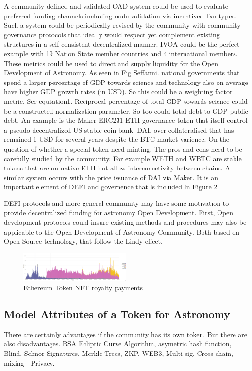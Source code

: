 \documentclass[final,5p,times,twocolumn,authoryear]{elsarticle}
\begin{document}
A community defined and validated OAD system could be used to evaluate preferred funding channels including node validation via incentives Txn types. Such a system could be periodically revised by the community with community governance protocols that ideally would respect yet complement existing structures in a self-consistent decentralized manner. IVOA could be the perfect example with 19 Nation State member countries and 4 international members. These metrics could be used to direct and supply liquidity for the Open Development of Astronomy. As seen in Fig Seffanni. national governments that spend a larger percentage of GDP towards science and technology also on average have higher GDP growth rates (in USD). So this could be a weighting factor metric. See equtation1. Reciprocal percentage of total GDP towards science could be a constructed normalization parameter. So too could total debt to GDP public debt.  An example is the Maker ERC231 ETH governance token that itself control a  pseudo-decentralized US stable coin bank, DAI, over-collateralised that has remained 1 USD for several years despite the BTC market varience.  On the question of whether a special token need minting. The pros and cons need to be carefully studied by the community. For example WETH and WBTC are stable tokens that are on native ETH but allow interconectivity between chains. A similar system occurs with the price issuance of DAI via Maker. It is an important element of DEFI and governence that is included in Figure 2.   

DEFI protocols and more general community may have some motivation to provide decentralized funding for astronomy Open Development. First, Open development protocols could insure existing methods and procedures may also be applicable to the Open Development of Astronomy Community. Both  based on Open Source technology, that follow the Lindy effect.

 \begin{figure}
    \centering
    \includegraphics[width=0.5\textwidth]{figs/royalty_pay.jpg}
    \caption{Ethereum Token NFT royalty payments}
\end{figure}
\subsection{Model Attributes of a Token for Astronomy}
\label{subsec:btc4}
There are certainly advantages if the community has its own token. But there are also disadvantages. RSA Ecliptic Curve Algorithm, asymetric hash function, Blind, Schnor Signatures, Merkle Trees, ZKP,  WEB3, Multi-sig, Cross chain, mixing - Privacy. 
\end{document}
